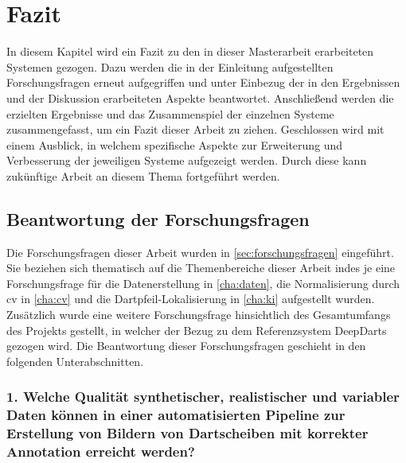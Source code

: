 
\chapter{Fazit}
\label{cha:fazit}

In diesem Kapitel wird ein Fazit zu den in dieser Masterarbeit erarbeiteten Systemen gezogen. Dazu werden die in der Einleitung aufgestellten Forschungsfragen erneut aufgegriffen und unter Einbezug der in den Ergebnissen und der Diskussion erarbeiteten Aspekte beantwortet. Anschließend werden die erzielten Ergebnisse und das Zusammenspiel der einzelnen Systeme zusammengefasst, um ein Fazit dieser Arbeit zu ziehen. Geschlossen wird mit einem Ausblick, in welchem spezifische Aspekte zur Erweiterung und Verbesserung der jeweiligen Systeme aufgezeigt werden. Durch diese kann zukünftige Arbeit an diesem Thema fortgeführt werden.

\section{Beantwortung der Forschungsfragen}
\label{sec:beantwortung_forschungsfragen}

Die Forschungsfragen dieser Arbeit wurden in \autoref{sec:forschungsfragen} eingeführt. Sie beziehen sich thematisch auf die Themenbereiche dieser Arbeit indes je eine Forschungsfrage für die Datenerstellung in \autoref{cha:daten}, die Normalisierung durch \ac{cv} in \autoref{cha:cv} und die Dartpfeil-Lokalisierung in \autoref{cha:ki} aufgestellt wurden. Zusätzlich wurde eine weitere Forschungsfrage hinsichtlich des Gesamtumfangs des Projekts gestellt, in welcher der Bezug zu dem Referenzsystem DeepDarts gezogen wird. Die Beantwortung dieser Forschungsfragen geschieht in den folgenden Unterabschnitten.

\subsection*{1. Welche Qualität synthetischer, realistischer und variabler Daten können in einer automatisierten Pipeline zur Erstellung von Bildern von Dartscheiben mit korrekter Annotation erreicht werden?}

